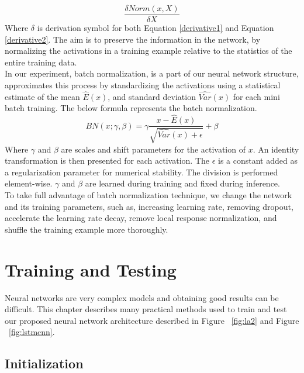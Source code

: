 \begin{equation}\label{derivative2}
    \frac{\delta Norm(x,X)}{\delta X}
\end{equation}
Where $\delta$ is derivation symbol for both Equation \ref{derivative1} and Equation \ref{derivative2}. 
The  aim is to preserve the information in the network, by
normalizing the activations in a training example relative
to the statistics of the entire training data.\\

In our experiment, batch normalization, is a part of our neural network structure, approximates this process by standardizing the activations using a statistical estimate of the mean $\widehat{E}(x)$, and standard deviation $\widehat{Var}(x)$  for each mini batch training. The below formula represents the batch normalization.
\begin{equation}
        BN\left ( x;\gamma ,\beta \right )=\gamma \frac{x-\widehat{E}(x)}{\sqrt{\widehat{Var}(x)+\epsilon }} +\beta
\end{equation}
Where $\gamma$ and $\beta$ are scales and shift parameters for the activation of $x$. An identity transformation is then presented for each activation. The $\epsilon$ is a constant added as a regularization parameter for numerical stability. The division is performed element-wise. $\gamma$ and $\beta$ are learned during training and fixed during inference.\\

To take full advantage of batch normalization technique, we change the network and its training parameters, such as, increasing learning rate, removing dropout, accelerate the learning rate decay, remove local response normalization, and shuffle the training example more thoroughly.

\section{Training and Testing}
Neural networks are very complex models and obtaining good results can be
difficult. This chapter describes many practical methods used to train and test our proposed neural network architecture described in Figure ~\ref{fig:la2} and Figure ~\ref{fig:lstmcnn}.

\subsection{Initialization}

